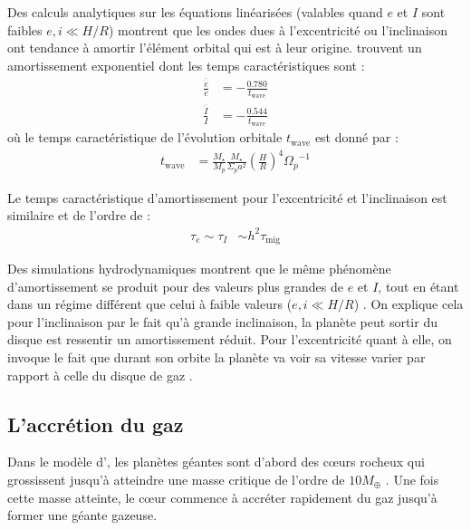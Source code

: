 Des calculs analytiques sur les équations linéarisées (valables quand $e$ et $I$ sont faibles $e,i \ll H/R$) montrent que les ondes dues à l'excentricité ou l'inclinaison ont tendance à amortir l'élément orbital qui est à leur origine. \cite[eqs. (45), (47)]{tanaka2004three} trouvent un amortissement exponentiel dont les temps caractéristiques sont : 
\begin{subequations}
\begin{align}
\frac{\overline{\dot{e}}}{e} &= -\frac{0.780}{t_\text{wave}}\\
\frac{\overline{\dot{I}}}{I} &= -\frac{0.544}{t_\text{wave}}
\end{align}
\end{subequations}
où le temps caractéristique de l'évolution orbitale $t_\text{wave}$ est donné par \cite[eq. (49)]{tanaka2004three} :
\begin{align}
t_\text{wave} &= \frac{M_\star}{M_p}\frac{M_\star}{\Sigma_p a^2} \left(\frac{H}{R}\right)^4 {\Omega_p}^{-1}
\end{align}

Le temps caractéristique d'amortissement pour l'excentricité et l'inclinaison est similaire et de l'ordre de \citep{tanaka2004three} :
\begin{align}
\tau_e \sim \tau_I &\sim h^2 \tau_\text{mig}
\end{align}

Des simulations hydrodynamiques montrent que le même phénomène d'amortissement se produit pour des valeurs plus grandes de $e$ et $I$, tout en étant dans un régime différent que celui à faible valeurs ($e,i \ll H/R$) \citep{cresswell2007evolution}. On explique cela pour l'inclinaison par le fait qu'à grande inclinaison, la planète peut sortir du disque est ressentir un amortissement réduit. Pour l'excentricité quant à elle, on invoque le fait que durant son orbite la planète va voir sa vitesse varier par rapport à celle du disque de gaz \citep{papaloizou2000orbital}.

\subsection{L'accrétion du gaz}\label{sec:accretion_coeur}
Dans le modèle d', les planètes géantes sont d'abord des c\oe urs rocheux qui grossissent jusqu'à atteindre une masse critique de l'ordre de $10 M_{\oplus}$ \citep{pollack1996formation}. Une fois cette masse atteinte, le c\oe ur commence à accréter rapidement du gaz jusqu'à former une géante gazeuse.

